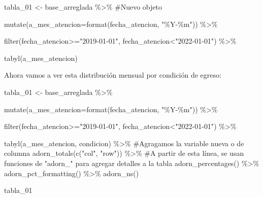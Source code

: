 \documentclass[
  letterpaper,
  DIV=11,
  numbers=noendperiod]{scrreprt}
\newenvironment{Shaded}{\begin{snugshade}}{\end{snugshade}}
\newcommand{\AttributeTok}[1]{\textcolor[rgb]{0.40,0.45,0.13}{#1}}
\newcommand{\CommentTok}[1]{\textcolor[rgb]{0.37,0.37,0.37}{#1}}
\newcommand{\FunctionTok}[1]{\textcolor[rgb]{0.28,0.35,0.67}{#1}}
\newcommand{\NormalTok}[1]{\textcolor[rgb]{0.00,0.23,0.31}{#1}}
\newcommand{\OtherTok}[1]{\textcolor[rgb]{0.00,0.23,0.31}{#1}}
\newcommand{\SpecialCharTok}[1]{\textcolor[rgb]{0.37,0.37,0.37}{#1}}
\newcommand{\StringTok}[1]{\textcolor[rgb]{0.13,0.47,0.30}{#1}}
\begin{document}
\begin{Shaded}
\begin{Highlighting}[]
\NormalTok{tabla\_01 }\OtherTok{\textless{}{-}}\NormalTok{ base\_arreglada }\SpecialCharTok{\%\textgreater{}\%}  \CommentTok{\#Nuevo objeto}
  
  \FunctionTok{mutate}\NormalTok{(}\AttributeTok{a\_mes\_atencion=}\FunctionTok{format}\NormalTok{(fecha\_atencion, }\StringTok{"\%Y{-}\%m"}\NormalTok{)) }\SpecialCharTok{\%\textgreater{}\%} 
 
   \FunctionTok{filter}\NormalTok{(fecha\_atencion}\SpecialCharTok{\textgreater{}=}\StringTok{"2019{-}01{-}01"}\NormalTok{, fecha\_atencion}\SpecialCharTok{\textless{}}\StringTok{"2022{-}01{-}01"}\NormalTok{) }\SpecialCharTok{\%\textgreater{}\%} 
  
  \FunctionTok{tabyl}\NormalTok{(a\_mes\_atencion)}
\end{Highlighting}
\end{Shaded}

Ahora vamos a ver esta distribución mensual por condición de egreso:

\begin{Shaded}
\begin{Highlighting}[]
\NormalTok{tabla\_01 }\OtherTok{\textless{}{-}}\NormalTok{ base\_arreglada }\SpecialCharTok{\%\textgreater{}\%} 
  
  \FunctionTok{mutate}\NormalTok{(}\AttributeTok{a\_mes\_atencion=}\FunctionTok{format}\NormalTok{(fecha\_atencion, }\StringTok{"\%Y{-}\%m"}\NormalTok{)) }\SpecialCharTok{\%\textgreater{}\%} 
 
   \FunctionTok{filter}\NormalTok{(fecha\_atencion}\SpecialCharTok{\textgreater{}=}\StringTok{"2019{-}01{-}01"}\NormalTok{, fecha\_atencion}\SpecialCharTok{\textless{}}\StringTok{"2022{-}01{-}01"}\NormalTok{) }\SpecialCharTok{\%\textgreater{}\%} 
  
  \FunctionTok{tabyl}\NormalTok{(a\_mes\_atencion,}
\NormalTok{        condicion)  }\SpecialCharTok{\%\textgreater{}\%}  \CommentTok{\#Agragamos la variable nueva o de columna}
  \FunctionTok{adorn\_totals}\NormalTok{(}\FunctionTok{c}\NormalTok{(}\StringTok{"col"}\NormalTok{, }\StringTok{"row"}\NormalTok{)) }\SpecialCharTok{\%\textgreater{}\%} \CommentTok{\#A partir de esta línea, se usan funciones de "adorn\_" para agregar detalles a la tabla}
  \FunctionTok{adorn\_percentages}\NormalTok{() }\SpecialCharTok{\%\textgreater{}\%} 
  \FunctionTok{adorn\_pct\_formatting}\NormalTok{() }\SpecialCharTok{\%\textgreater{}\%} 
  \FunctionTok{adorn\_ns}\NormalTok{()}
  

\NormalTok{tabla\_01}
\end{Highlighting}
\end{Shaded}
\end{document}
